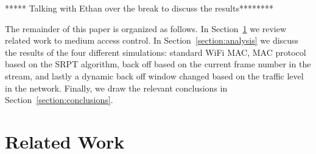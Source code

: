 \documentclass{sigcomm-alternate}
\begin{document}

***** Talking with Ethan over the break to discuss the results********

The remainder of this paper is organized as follows. In Section~\ref{section:relatedwork} we review related work to medium access control. In Section~\ref{section:analysis} we discuss the results of the four different simulations: standard WiFi MAC, MAC protocol based on the SRPT algorithm, back off based on the current frame number in the stream, and lastly a dynamic back off window changed based on the traffic level in the network. Finally, we draw the relevant conclusions in Section~\ref{section:conclusions}.


%
%
%
%


\section{Related Work}
\label{section:relatedwork}

\end{document}
